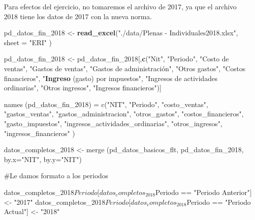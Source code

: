 \documentclass[
  11pt,
]{article}
\newenvironment{Shaded}{\begin{snugshade}}{\end{snugshade}}
\newcommand{\DataTypeTok}[1]{\textcolor[rgb]{0.13,0.29,0.53}{#1}}
\newcommand{\DecValTok}[1]{\textcolor[rgb]{0.00,0.00,0.81}{#1}}
\newcommand{\KeywordTok}[1]{\textcolor[rgb]{0.13,0.29,0.53}{\textbf{#1}}}
\newcommand{\NormalTok}[1]{#1}
\newcommand{\StringTok}[1]{\textcolor[rgb]{0.31,0.60,0.02}{#1}}
\begin{document}
Para efectos del ejercicio, no tomaremos el archivo de 2017, ya que el
archivo 2018 tiene los datos de 2017 con la nueva norma.

\begin{Shaded}
\begin{Highlighting}[]
\NormalTok{pd_datos_fin_}\DecValTok{2018}\NormalTok{ <-}\StringTok{ }\KeywordTok{read_excel}\NormalTok{(}\StringTok{"./data/Plenas - Individuales2018.xlsx"}\NormalTok{, }\DataTypeTok{sheet =} \StringTok{"ERI"}\NormalTok{ )}

\NormalTok{pd_datos_fin_}\DecValTok{2018}\NormalTok{ <-}\StringTok{ }\NormalTok{pd_datos_fin_}\DecValTok{2018}\NormalTok{[,}\KeywordTok{c}\NormalTok{(}\StringTok{"Nit"}\NormalTok{, }\StringTok{"Periodo"}\NormalTok{, }\StringTok{"Costo de ventas"}\NormalTok{, }\StringTok{"Gastos de ventas"}\NormalTok{, }\StringTok{"Gastos de administración", "}\NormalTok{Otros gastos}\StringTok{", "}\NormalTok{Costos financieros}\StringTok{", "}\KeywordTok{Ingreso}\NormalTok{ (gasto) por impuestos}\StringTok{", "}\NormalTok{Ingresos de actividades ordinarias}\StringTok{", "}\NormalTok{Otros ingresos}\StringTok{", "}\NormalTok{Ingresos financieros}\StringTok{")]}

\StringTok{names (pd_datos_fin_2018) = c("}\NormalTok{NIT}\StringTok{", "}\NormalTok{Periodo}\StringTok{", "}\NormalTok{costo_ventas}\StringTok{", "}\NormalTok{gastos_ventas}\StringTok{", "}\NormalTok{gastos_administracion}\StringTok{", "}\NormalTok{otros_gastos}\StringTok{", "}\NormalTok{costos_financieros}\StringTok{", "}\NormalTok{gasto_impuestos}\StringTok{", "}\NormalTok{ingresos_actividades_ordinarias}\StringTok{", "}\NormalTok{otros_ingresos}\StringTok{", "}\NormalTok{ingresos_financieros}\StringTok{" )}

\StringTok{datos_completos_2018 <- merge (pd_datos_basicos_flt, pd_datos_fin_2018, by.x="}\NormalTok{NIT}\StringTok{", by.y="}\NormalTok{NIT}\StringTok{")}

\StringTok{#Le damos formato a los periodos}

\StringTok{datos_completos_2018$Periodo[datos_completos_2018$Periodo == "}\NormalTok{Periodo Anterior}\StringTok{"] <- "}\DecValTok{2017}\StringTok{"}
\StringTok{datos_completos_2018$Periodo[datos_completos_2018$Periodo == "}\NormalTok{Periodo Actual}\StringTok{"] <- "}\DecValTok{2018}\StringTok{"}
\end{Highlighting}
\end{Shaded}
\end{document}
